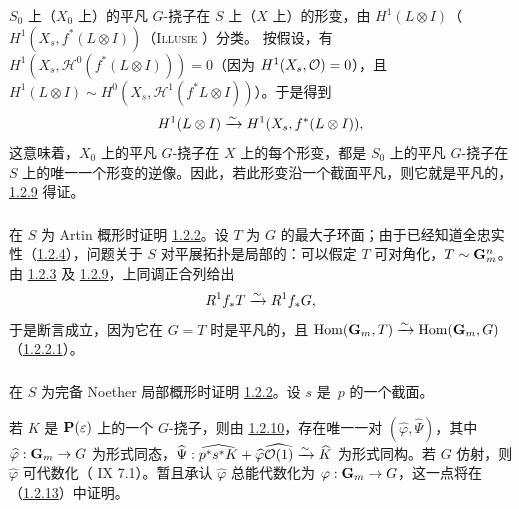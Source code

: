 $S_{0}$ 上（\resp $X_{0}$ 上）的平凡 $G$-挠子在 $S$ 上（\resp $X$ 上）的形变，由 $H^{1}(L\otimes I)$（\resp $H^{1}(X_{s},f^{\ast}(L\otimes I))$（\textsc{Illusie} \cite[VII~2.4.4~(ii)]{sga4.exp.XVIII.bib.3}）分类。
按假设，有 $H^{1}(X_{s},ℋ^0(f^{\ast}(L\otimes I)))=0$（因为 $H^{1}(X_{s},{\mathcal O})=0$），且 $H^{1}(L\otimes I)\sim H^0(X_{s}, ℋ^{1}(f^{\ast}L\otimes I))$）。于是得到
$$
H^{1}(L\otimes I)\xrightarrow{\sim} H^{1}(X_{s},f^{\ast}(L\otimes
I)){},
$$
这意味着，$X_{0}$ 上的平凡 $G$-挠子在 $X$ 上的每个形变，都是 $S_{0}$ 上的平凡 $G$-挠子在 $S$ 上的唯一一个形变的逆像。因此，若此形变沿一个截面平凡，则它就是平凡的，\hyperref[XVIII.lem1.2.9]{1.2.9} 得证。

\setcounter{subsubsection}{9}
\subsubsection{}
在 $S$ 为 Artin 概形时证明 \hyperref[XVIII.thm1.2.2]{1.2.2}。设 $T$ 为 $G$ 的最大子环面；由于已经知道全忠实性（\hyperref[XVIII.lem1.2.4]{1.2.4}），问题关于 $S$ 对平展拓扑是局部的：可以假定 $T$ 可对角化，$T\sim \mathbf{G}^{n}_{m}$。由 \hyperref[XVIII.lem1.2.3]{1.2.3} 及 \hyperref[XVIII.lem1.2.9]{1.2.9}，上同调正合列给出
$$
R^{1}f_{\ast}T\xrightarrow{\sim} R^{1}f_{\ast}G{},
$$
于是断言成立，因为它在 $G=T$ 时是平凡的，且 $\operatorname{Hom}(\mathbf{G}_{m},T)\xrightarrow{\sim}\operatorname{Hom}(\mathbf{G}_{m},G)$（\cf \hyperref[XVIII.par1.2.2.1]{1.2.2.1}）。

\subsubsection{}
在 $S$ 为完备 Noether 局部概形时证明 \hyperref[XVIII.thm1.2.2]{1.2.2}。设 $s$ 是~$p$ 的一个截面。

\noindent
若 $K$ 是 $\mathbf{P}(\varepsilon)$ 上的一个 $G$-挠子，则由 \hyperref[XVIII.subsubsec1.2.10]{1.2.10}，存在唯一一对 $(\widehat{\varphi},\widehat{\Psi})$，其中 $\widehat{\varphi}:\mathbf{G}_{m}\rightarrow G$ 为形式同态，$\widehat{\Psi}:\widehat{p^{\ast}s^{\ast}K}+\widehat{\varphi}\widehat{{\mathcal O}(1)}\xrightarrow{\sim}\widehat{K}$ 为形式同构\pageoriginale{}。若 $G$ 仿射，则 $\widehat{\varphi}$ 可代数化（ IX 7.1）。暂且承认 $\widehat{\varphi}$ 总能代数化为 $\varphi:\mathbf{G}_{m}\rightarrow G$，这一点将在（\hyperref[XVIII.subsubsec1.2.13]{1.2.13}）中证明。

